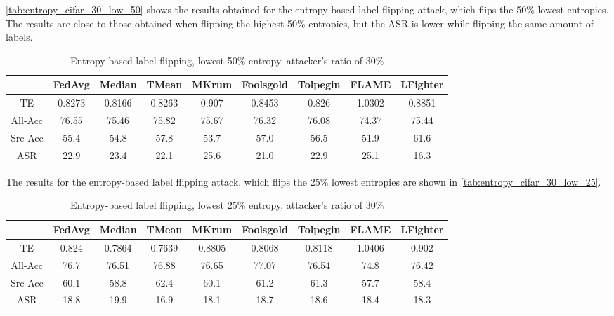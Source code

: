 \autoref{tab:entropy_cifar_30_low_50} shows the results obtained for the entropy-based label flipping attack, which flips the 50\% lowest entropies. The results are close to those obtained when flipping the highest 50\% entropies, but the ASR is lower while flipping the same amount of labels.


\begin{table}[h!]
        \centering
        \small
        \begin{adjustbox}{center}
        \begin{tabular}{|c|c|c|c|c|c|c|c|c|}
            \hline
            & FedAvg & Median & TMean & MKrum & Foolsgold & Tolpegin & FLAME & LFighter \\
            \hline
            TE & 0.8273 & 0.8166 & 0.8263 & 0.907 & 0.8453 & 0.826 & 1.0302 & 0.8851 \\
            \hline
            All-Acc & 76.55 & 75.46 & 75.82 & 75.67 & 76.32 & 76.08 & 74.37 & 75.44 \\
            \hline
            Src-Acc & 55.4 & 54.8 & 57.8 & 53.7 & 57.0 & 56.5 & 51.9 & 61.6 \\
            \hline
            ASR & 22.9 & 23.4 & 22.1 & 25.6 & 21.0 & 22.9 & 25.1 & 16.3 \\
            \hline
        \end{tabular}
        \end{adjustbox}
        \caption{Entropy-based label flipping, lowest 50\% entropy, attacker's ratio of 30\%}
        \label{tab:entropy_cifar_30_low_50}
    \end{table}
    

The results for the entropy-based label flipping attack, which flips the 25\% lowest entropies are shown in \autoref{tab:entropy_cifar_30_low_25}.

\begin{table}[h!]
        \centering
        \small
        \begin{adjustbox}{center}
        \begin{tabular}{|c|c|c|c|c|c|c|c|c|}
            \hline
            & FedAvg & Median & TMean & MKrum & Foolsgold & Tolpegin & FLAME & LFighter \\
            \hline
            TE & 0.824 & 0.7864 & 0.7639 & 0.8805 & 0.8068 & 0.8118 & 1.0406 & 0.902 \\
            \hline
            All-Acc & 76.7 & 76.51 & 76.88 & 76.65 & 77.07 & 76.54 & 74.8 & 76.42 \\
            \hline
            Src-Acc & 60.1 & 58.8 & 62.4 & 60.1 & 61.2 & 61.3 & 57.7 & 58.4 \\
            \hline
            ASR & 18.8 & 19.9 & 16.9 & 18.1 & 18.7 & 18.6 & 18.4 & 18.3 \\
            \hline
        \end{tabular}
        \end{adjustbox}
        \caption{Entropy-based label flipping, lowest 25\% entropy, attacker's ratio of 30\%}
        \label{tab:entropy_cifar_30_low_25}
    \end{table}

